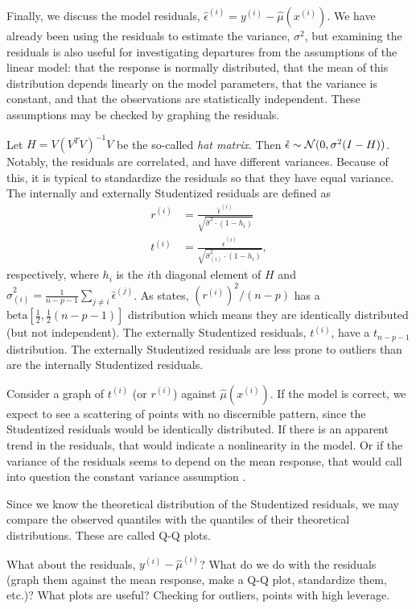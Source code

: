 \documentclass[12pt]{article}
\begin{document}
Finally, we discuss the model residuals, $\hat{\epsilon}^{(i)} = y^{(i)} - \hat{\mu}(x^{(i)})$. We have already been using the residuals to estimate the variance, $\sigma^2$, but examining the residuals is also useful for investigating departures from the assumptions of the linear model: that the response is normally distributed, that the mean of this distribution depends linearly on the model parameters, that the variance is constant, and that the observations are statistically independent. These assumptions may be checked by graphing the residuals.

Let $H = V (V^T V)^{-1} V$ be the so-called \textit{hat matrix}. Then $\hat{\epsilon} \sim {\mathcal N}(0, \sigma^2 (I - H))$. Notably, the residuals are correlated, and have different variances. Because of this, it is typical to standardize the residuals so that they have equal variance. The internally and externally Studentized residuals are defined as
\begin{align*}
   r^{(i)} &= \frac{\hat{\epsilon}^{(i)}}{\sqrt{\hat{\sigma}^2 \cdot (1 - h_i)}} \\
   t^{(i)} &= \frac{\hat{\epsilon}^{(i)}}{\sqrt{\hat{\sigma}_{(i)}^2 \cdot (1 - h_i)}},
\end{align*}
respectively, where $h_i$ is the $i$th diagonal element of $H$ and $\hat{\sigma}_{(i)}^2 = \frac{1}{n-p-1} \sum_{j \neq i} \hat{\epsilon}^{(j)}$. As \cite[\S~10.2]{Seber:2003} states, $(r^{(i)})^2/(n-p)$ has a $\textrm{beta}[\frac{1}{2}, \frac{1}{2}(n-p-1)]$ distribution which means they are identically distributed (but not independent). The externally Studentized residuals, $t^{(i)}$, have a $t_{n-p-1}$ distribution. The externally Studentized residuals are less prone to outliers than are the internally Studentized residuals.

Consider a graph of $t^{(i)}$ (or $r^{(i)}$) against $\hat{\mu}(x^{(i)})$. If the model is correct, we expect to see a scattering of points with no discernible pattern, since the Studentized residuals would be identically distributed. If there is an apparent trend in the residuals, that would indicate a nonlinearity in the model. Or if the variance of the residuals seems to depend on the mean response, that would call into question the constant variance assumption \cite[\S~8.1.5]{Weisberg:2005}.

Since we know the theoretical distribution of the Studentized residuals, we may compare the observed quantiles with the quantiles of their theoretical distributions. These are called Q-Q plots.

What about the residuals, $y^{(i)} - \hat{\mu}^{(i)}$? What do we do with the residuals (graph them against the mean response, make a Q-Q plot, standardize them, etc.)? What plots are useful? Checking for outliers, points with high leverage.


\newpage

\end{document}
